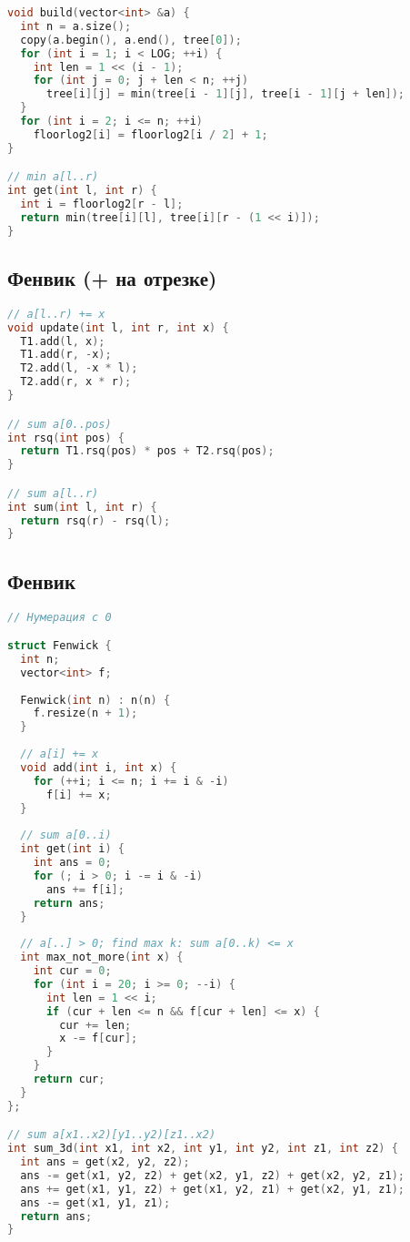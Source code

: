 \documentclass[9pt,a4paper,landscape,twosided]{extarticle}
\begin{document}
\begin{multicols*}{3}
\begin{lstlisting}[language=C++]
void build(vector<int> &a) {
  int n = a.size();
  copy(a.begin(), a.end(), tree[0]);
  for (int i = 1; i < LOG; ++i) {
    int len = 1 << (i - 1);
    for (int j = 0; j + len < n; ++j)
      tree[i][j] = min(tree[i - 1][j], tree[i - 1][j + len]);
  }
  for (int i = 2; i <= n; ++i)
    floorlog2[i] = floorlog2[i / 2] + 1;
}

// min a[l..r)
int get(int l, int r) {
  int i = floorlog2[r - l];
  return min(tree[i][l], tree[i][r - (1 << i)]);
}

\end{lstlisting}

\subsection{Фенвик (+ на отрезке)}
\begin{lstlisting}[language=C++]
// a[l..r) += x
void update(int l, int r, int x) {
  T1.add(l, x);
  T1.add(r, -x);
  T2.add(l, -x * l);
  T2.add(r, x * r);
}

// sum a[0..pos)
int rsq(int pos) {
  return T1.rsq(pos) * pos + T2.rsq(pos);
}

// sum a[l..r)
int sum(int l, int r) {
  return rsq(r) - rsq(l);
}

\end{lstlisting}

\subsection{Фенвик}
\begin{lstlisting}[language=C++]
// Нумерация с 0

struct Fenwick {
  int n;
  vector<int> f;
 
  Fenwick(int n) : n(n) {
    f.resize(n + 1);
  }
 
  // a[i] += x
  void add(int i, int x) {
    for (++i; i <= n; i += i & -i)
      f[i] += x;
  }
 
  // sum a[0..i)
  int get(int i) {
    int ans = 0;
    for (; i > 0; i -= i & -i)
      ans += f[i];
    return ans;
  }
 
  // a[..] > 0; find max k: sum a[0..k) <= x
  int max_not_more(int x) {
    int cur = 0;
    for (int i = 20; i >= 0; --i) {
      int len = 1 << i;
      if (cur + len <= n && f[cur + len] <= x) {
        cur += len;
        x -= f[cur];
      }
    }
    return cur;
  }
};

// sum a[x1..x2)[y1..y2)[z1..x2)
int sum_3d(int x1, int x2, int y1, int y2, int z1, int z2) {
  int ans = get(x2, y2, z2);
  ans -= get(x1, y2, z2) + get(x2, y1, z2) + get(x2, y2, z1);
  ans += get(x1, y1, z2) + get(x1, y2, z1) + get(x2, y1, z1);
  ans -= get(x1, y1, z1);
  return ans;
}
\end{lstlisting}


\end{multicols*}
\end{document}
